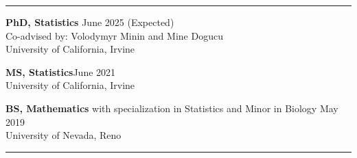 \documentclass{article}
\begin{document}
	\vspace{-2mm}
	\rule{\linewidth}{1pt}
	
	
	
	\begin{description}
		\vspace{-2mm}
		\item[Education]\hspace*{.1in}
		
		\textbf{PhD, Statistics} \hfill{June 2025 (Expected)} \\
		Co-advised by: Volodymyr Minin and Mine Dogucu\\	
		University of California, Irvine
		\vspace*{1mm}
		
		\textbf{MS, Statistics}\hfill{June 2021}\\
		University of California, Irvine
		\vspace*{1mm}
		
		\textbf{BS, Mathematics} with specialization in Statistics and Minor in Biology \hfill{May 2019} \\
		University of Nevada, Reno
		
	\end{description}
	\vspace{-2mm}
	\rule{\linewidth}{1pt}
	
	
	
\end{document}
